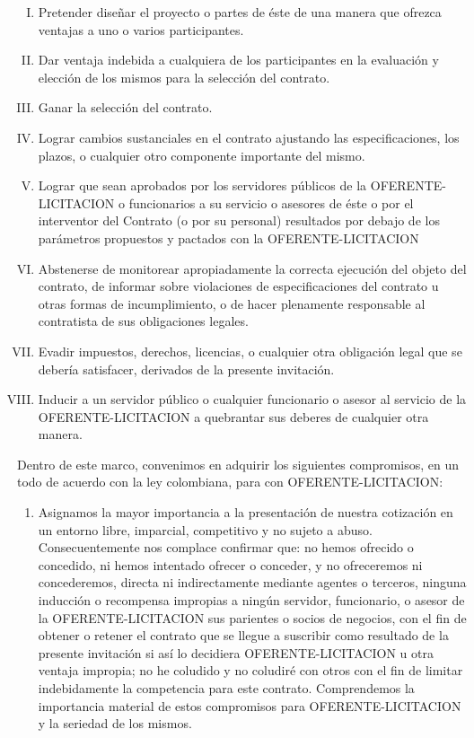 \documentclass[11pt,a4paper]{letter} %
\begin{document}
\begin{letter}
\begin{enumerate}[I.]
\item Pretender diseñar el proyecto o partes de éste de una manera que ofrezca
ventajas a uno o varios participantes.

\item Dar ventaja indebida a cualquiera de los participantes en la evaluación y
elección de los mismos para la selección del contrato.

\item Ganar la selección del contrato.

\item Lograr cambios sustanciales en el contrato ajustando las especificaciones, los
plazos, o cualquier otro componente importante del mismo.

\item Lograr que sean aprobados por los servidores públicos de la OFERENTE-LICITACION o funcionarios a su servicio o asesores de éste o por
el interventor del Contrato (o por su personal) resultados por debajo de los
parámetros propuestos y pactados con la OFERENTE-LICITACION

\item Abstenerse de monitorear apropiadamente la correcta ejecución del objeto del
contrato, de informar sobre violaciones de especificaciones del contrato u otras
formas de incumplimiento, o de hacer plenamente responsable al contratista de
sus obligaciones legales.

\item Evadir impuestos, derechos, licencias, o cualquier otra obligación legal que se debería satisfacer, derivados de la presente invitación.

\item Inducir a un servidor público o cualquier funcionario o asesor al servicio de la OFERENTE-LICITACION a quebrantar sus deberes de cualquier otra manera.
\end{enumerate}

Dentro de este marco, convenimos en adquirir los siguientes compromisos, en un todo
de acuerdo con la ley colombiana, para con OFERENTE-LICITACION:

\begin{enumerate}
\item Asignamos la mayor importancia a la presentación de nuestra cotización en un
entorno libre, imparcial, competitivo y no sujeto a abuso. Consecuentemente nos
complace confirmar que: no hemos ofrecido o concedido, ni hemos intentado
ofrecer o conceder, y no ofreceremos ni concederemos, directa ni indirectamente
mediante agentes o terceros, ninguna inducción o recompensa impropias a ningún
servidor, funcionario, o asesor de la OFERENTE-LICITACION sus
parientes o socios de negocios, con el fin de obtener o retener el contrato que se
llegue a suscribir como resultado de la presente invitación si así lo decidiera OFERENTE-LICITACION u otra ventaja impropia; no he coludido
y no coludiré con otros con el fin de limitar indebidamente la competencia para
este contrato. Comprendemos la importancia material de estos compromisos para OFERENTE-LICITACION y la seriedad de los mismos.


\end{enumerate}
\end{letter}
\end{document}
